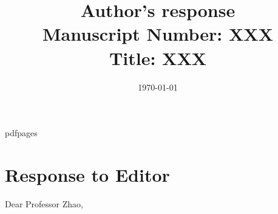 \marginsize{2cm}{2cm}{0cm}{1cm} %
\renewcommand\familydefault{\sfdefault}


 \renewcommand{\topfraction}{.9}	%
 \renewcommand{\bottomfraction}{.9}	%
 \renewcommand{\textfraction}{0.1}	%

 
\newenvironment{ig}[1]{
\begin{center}
 \texttt{[image: \#1]} 
\end{center}}

\usepackage{pdfpages}

\newlength\tindent
\setlength{\tindent}{\parindent}
\setlength{\parindent}{0pt}
\renewcommand{\indent}{\hspace*{\tindent}}

 
\date{{}\today}
\title{Author's response\\ {\large Manuscript Number: XXX \\ Title:  XXX }}

\author{}


\maketitle

\tableofcontents

\section{Response to Editor} 


\noindent Dear Professor Zhao,\\

